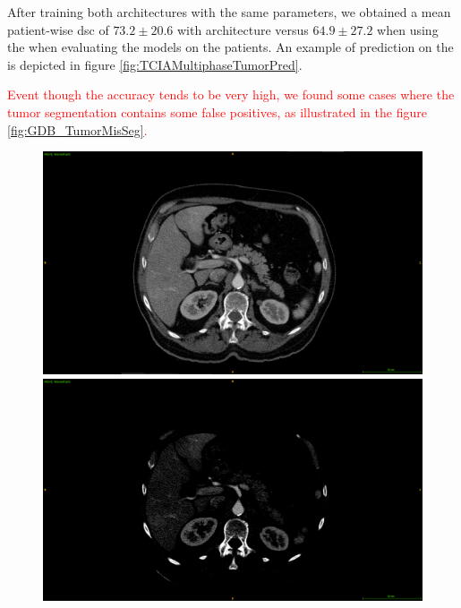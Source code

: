 After training both architectures with
the same parameters, we obtained a mean patient-wise \ac{dsc} of $ 73.2 \pm 20.6 $ with 
architecture versus $ 64.9 \pm 27.2 $ when using the  when evaluating the
models on the \textbf{} patients. An example of prediction on the \textbf{} is
depicted in figure \ref{fig:TCIAMultiphaseTumorPred}. 
\textcolor{red}
{
Event though the accuracy tends to be very high, we found some cases where the tumor segmentation contains some false positives, as illustrated in the figure \ref{fig:GDB_TumorMisSeg}.
\begin{figure}[!ht]
	\begin{mdframed}[backgroundcolor=blue!50,linecolor=blue!50]
		\centering
		\begin{minipage}{0.3\linewidth}
			\includegraphics[width=\linewidth]{images/MisSegmentations/TCGA-DD-A1ED_slice41_raw}
		\end{minipage} \hspace{-0.1cm}
		\begin{minipage}{0.3\linewidth}
			\includegraphics[width=\linewidth]{images/MisSegmentations/TCGA-DD-A1ED_slice41_raw_windowed}

\end{minipage}
\end{mdframed}
\end{figure}}
